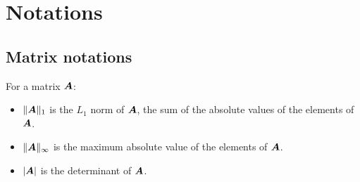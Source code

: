 \chapter{Notations}

\section{Matrix notations}
For a matrix $\boldsymbol A$:
\begin{itemize}
	\item $\|\boldsymbol A\|_1$ is the $L_1$ norm of $\boldsymbol A$, the sum of the absolute values of the elements of $\boldsymbol A$.
	\item $\|\boldsymbol A\|_\infty$ is the maximum absolute value of the elements of $\boldsymbol A$.
	\item $|\boldsymbol A|$ is the determinant of $\boldsymbol A$.
\end{itemize}
